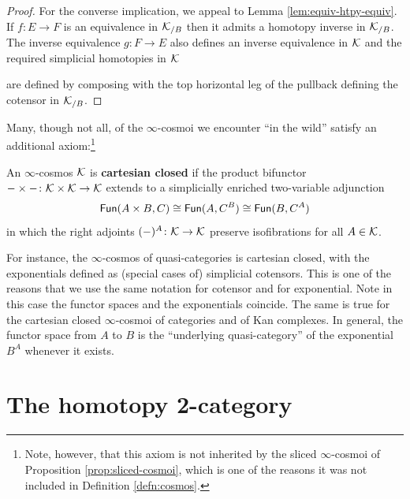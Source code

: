 \begin{proof}
For the converse implication, we appeal to  Lemma \ref{lem:equiv-htpy-equiv}. If $f \colon E \to F$ is an equivalence in ${\mathord{\mathcal{K}}}_{/B}$ then it admits a homotopy inverse in ${\mathord{\mathcal{K}}}_{/B}$. The inverse equivalence $g \colon F \to E$ also defines an inverse equivalence in ${\mathord{\mathcal{K}}}$ and the required simplicial homotopies in ${\mathord{\mathcal{K}}}$
\begin{center}
\end{center}
are defined by composing with the top horizontal leg of the pullback defining the cotensor in ${\mathord{\mathcal{K}}}_{/B}$.
\end{proof}

Many, though not all, of the $\infty$-cosmoi we encounter ``in the wild'' satisfy an additional axiom:\footnote{Note, however, that this axiom is not inherited by the sliced $\infty$-cosmoi of Proposition \ref{prop:sliced-cosmoi}, which is one of the reasons it was not included in Definition \ref{defn:cosmos}.}

\begin{definition}\label{defn:closed-cosmos}
   An $\infty$-cosmos ${\mathord{\mathcal{K}}}$ is \textbf{cartesian closed} if the product bifunctor
$- \times -\colon {\mathord{\mathcal{K}}} \times {\mathord{\mathcal{K}}} \to {\mathord{\mathcal{K}}}$ extends to a simplicially enriched two-variable adjunction
\[ {\mathord{\mathsf{Fun}}}(A \times B,C) \cong {\mathord{\mathsf{Fun}}}(A,C^B) \cong {\mathord{\mathsf{Fun}}}(B,C^A)\]
in which the right adjoints $(-)^A \colon {\mathord{\mathcal{K}}} \to {\mathord{\mathcal{K}}}$ preserve isofibrations for all $A \in {\mathord{\mathcal{K}}}$.
\end{definition}

For instance, the $\infty$-cosmos of quasi-categories is cartesian closed, with the exponentials defined as (special cases of) simplicial cotensors. This is one of the reasons that we use the same notation for cotensor and for exponential. Note in this case the functor spaces and the exponentials coincide. The same is true for the cartesian closed $\infty$-cosmoi of categories and of Kan complexes. In general, the functor space from $A$ to $B$ is the ``underlying quasi-category'' of the exponential $B^A$ whenever it exists. %


\section{The homotopy 2-category}\label{sec:htpy-2-cat}

